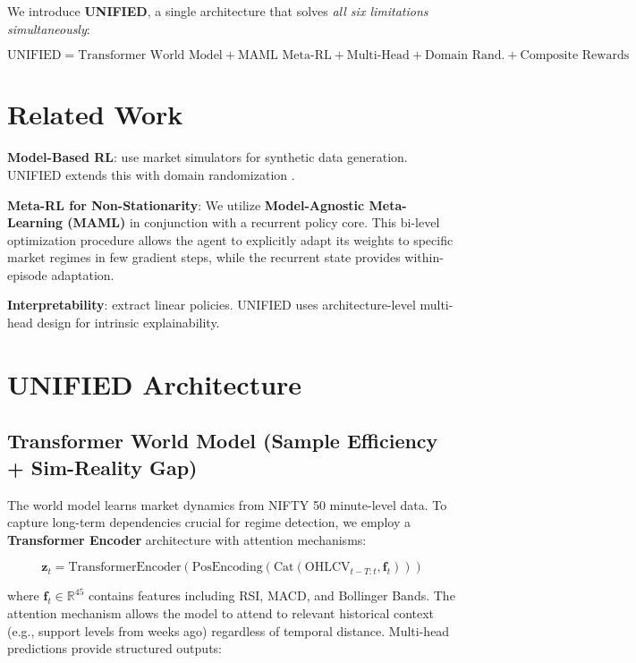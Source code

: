 \documentclass[11pt]{article}
\begin{document}
We introduce \textbf{UNIFIED}, a single architecture that solves \emph{all six limitations simultaneously}:

\begin{equation}
    \text{UNIFIED} = \text{Transformer World Model} + \text{MAML Meta-RL} + \text{Multi-Head} + \text{Domain Rand.} + \text{Composite Rewards}
\end{equation}

\section{Related Work}

\textbf{Model-Based RL}: \citet{wei2019} use market simulators for synthetic data generation. UNIFIED extends this with domain randomization \citep{dr4drl2024}.

\textbf{Meta-RL for Non-Stationarity}: We utilize \textbf{Model-Agnostic Meta-Learning (MAML)} in conjunction with a recurrent policy core. This bi-level optimization procedure allows the agent to explicitly adapt its weights to specific market regimes in few gradient steps, while the recurrent state provides within-episode adaptation.

\textbf{Interpretability}: \citet{li2025silver} extract linear policies. UNIFIED uses architecture-level multi-head design for intrinsic explainability.

\section{UNIFIED Architecture}

\subsection{Transformer World Model (Sample Efficiency + Sim-Reality Gap)}

The world model learns market dynamics from NIFTY 50 minute-level data. To capture long-term dependencies crucial for regime detection, we employ a \textbf{Transformer Encoder} architecture with attention mechanisms:

\begin{equation}
    \mathbf{z}_t = \text{TransformerEncoder}(\text{PosEncoding}(\text{Cat}(\text{OHLCV}_{t-T:t}, \mathbf{f}_t)))
\end{equation}

where $\mathbf{f}_t \in \mathbb{R}^{45}$ contains features including RSI, MACD, and Bollinger Bands. The attention mechanism allows the model to attend to relevant historical context (e.g., support levels from weeks ago) regardless of temporal distance. Multi-head predictions provide structured outputs:
\end{document}
